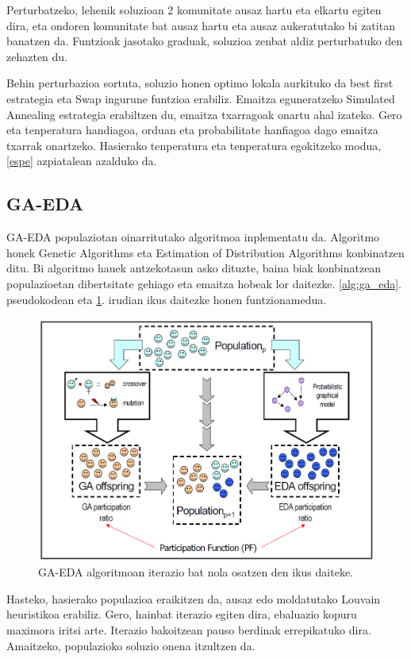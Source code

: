 \documentclass[sigconf]{acmart}
\begin{document}
Perturbatzeko, lehenik soluzioan 2 komunitate ausaz hartu eta elkartu egiten dira, eta ondoren komunitate bat ausaz hartu eta ausaz aukeratutako bi zatitan banatzen da. Funtzioak jasotako graduak, soluzioa zenbat aldiz perturbatuko den zehazten du. 

Behin perturbazioa sortuta, soluzio honen optimo lokala aurkituko da best first estrategia eta Swap ingurune funtzioa erabiliz. Emaitza eguneratzeko Simulated Annealing estrategia erabiltzen du, emaitza txarragoak onartu ahal izateko. Gero eta tenperatura handiagoa, orduan eta probabilitate hanfiagoa dago emaitza txarrak onartzeko. Hasierako tenperatura eta tenperatura egokitzeko modua, \ref{espe} azpiatalean azalduko da.

\subsection{GA-EDA}
GA-EDA \cite{pena2004ga} populaziotan oinarritutako algoritmoa inplementatu da. Algoritmo honek Genetic Algorithms eta Estimation of Distribution Algorithms konbinatzen ditu. Bi algoritmo hauek antzekotasun asko dituzte, baina biak konbinatzean populazioetan dibertsitate gehiago eta emaitza hobeak lor daitezke. \ref{alg:ga_eda}. pseudokodean eta \ref{fig:ga_eda}. irudian ikus daitezke honen funtzionamedua.

\begin{figure}
    \centering
    \includegraphics[width=\linewidth]{GA-EDA}
    \caption{GA-EDA algoritmoan iterazio bat nola osatzen den ikus daiteke.}
    \label{fig:ga_eda}
\end{figure}

Hasteko, hasierako populazioa eraikitzen da, ausaz edo moldatutako Louvain heuristikoa erabiliz. Gero, hainbat iterazio egiten dira, ebaluazio kopuru maximora iritsi arte. Iterazio bakoitzean pauso berdinak errepikatuko dira. Amaitzeko, populazioko soluzio onena itzultzen da.  
\end{document}
